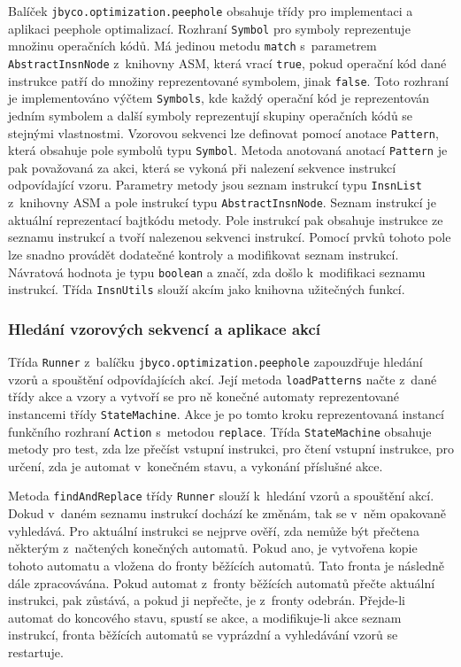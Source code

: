 Balíček \texttt{jbyco.optimization.peephole} obsahuje třídy pro implementaci a aplikaci peephole optimalizací. Rozhraní \texttt{Symbol} pro symboly reprezentuje množinu operačních kódů. Má jedinou metodu \texttt{match} s~parametrem \texttt{AbstractInsnNode} z~knihovny ASM, která vrací \texttt{true}, pokud operační kód dané instrukce patří do množiny reprezentované symbolem, jinak \texttt{false}. Toto rozhraní je implementováno výčtem \texttt{Symbols}, kde každý operační kód je reprezentován jedním symbolem a další symboly reprezentují skupiny operačních kódů se stejnými vlastnostmi. Vzorovou sekvenci lze definovat pomocí anotace \texttt{Pattern}, která obsahuje pole symbolů typu \texttt{Symbol}. Metoda anotovaná anotací \texttt{Pattern} je pak považovaná za akci, která se vykoná při nalezení sekvence instrukcí odpovídající vzoru. Parametry metody jsou seznam instrukcí typu \texttt{InsnList} z~knihovny ASM a pole instrukcí typu \texttt{AbstractInsnNode}. Seznam instrukcí je aktuální reprezentací bajtkódu metody. Pole instrukcí pak obsahuje instrukce ze seznamu instrukcí a tvoří nalezenou sekvenci instrukcí. Pomocí prvků tohoto pole lze snadno provádět dodatečné kontroly a modifikovat seznam instrukcí. Návratová hodnota je typu \texttt{boolean} a značí, zda došlo k~modifikaci seznamu instrukcí. Třída \texttt{InsnUtils} slouží akcím jako knihovna užitečných funkcí.

\subsubsection{Hledání vzorových sekvencí a aplikace akcí}

Třída \texttt{Runner} z~balíčku \texttt{jbyco.optimization.peephole} zapouzdřuje hledání vzorů a spouštění odpovídajících akcí. Její metoda \texttt{loadPatterns} načte z~dané třídy akce a vzory a vytvoří se pro ně konečné automaty reprezentované instancemi třídy \texttt{StateMachine}. Akce je po tomto kroku reprezentovaná instancí funkčního rozhraní \texttt{Action} s~metodou \texttt{replace}. Třída \texttt{StateMachine} obsahuje metody pro test, zda lze přečíst vstupní instrukci, pro čtení vstupní instrukce, pro určení, zda je automat v~konečném stavu, a vykonání příslušné akce. 

Metoda \texttt{findAndReplace} třídy \texttt{Runner} slouží k~hledání vzorů a spouštění akcí. Dokud v~daném seznamu instrukcí dochází ke změnám, tak se v~něm opakovaně vyhledává. Pro aktuální instrukci se nejprve ověří, zda nemůže být přečtena některým z~načtených konečných automatů. Pokud ano, je vytvořena kopie tohoto automatu a vložena do fronty běžících automatů. Tato fronta je následně dále zpracovávána. Pokud automat z~fronty běžících automatů přečte aktuální instrukci, pak zůstává, a pokud ji nepřečte, je z~fronty odebrán. Přejde-li automat do koncového stavu, spustí se akce, a modifikuje-li akce seznam instrukcí, fronta běžících automatů se vyprázdní a vyhledávání vzorů se restartuje.

